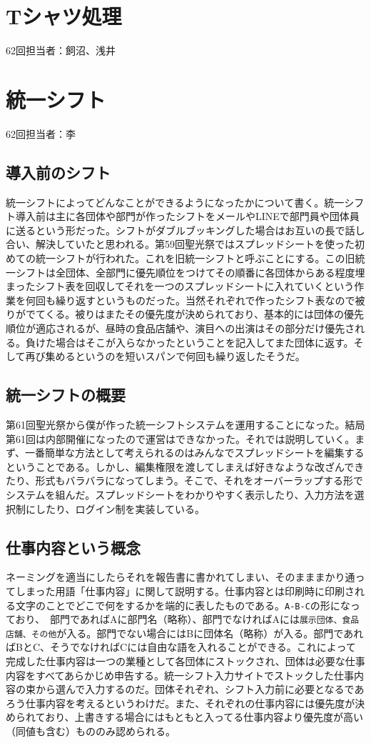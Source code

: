 \documentclass[dvipdfmx,jb5]{jarticle}
\begin{document}
 \section{Tシャツ処理}
 62回担当者：飼沼、浅井

 \section{統一シフト}\label{sec:統一シフト}
 62回担当者：李
  \subsection{導入前のシフト}
  統一シフトによってどんなことができるようになったかについて書く。統一シフト導入前は主に各団体や部門が作ったシフトをメールやLINEで部門員や団体員に送るという形だった。シフトがダブルブッキングした場合はお互いの長で話し合い、解決していたと思われる。第59回聖光祭ではスプレッドシートを使った初めての統一シフトが行われた。これを旧統一シフトと呼ぶことにする。この旧統一シフトは全団体、全部門に優先順位をつけてその順番に各団体からある程度埋まったシフト表を回収してそれを一つのスプレッドシートに入れていくという作業を何回も繰り返すというものだった。当然それぞれで作ったシフト表なので被りがでてくる。被りはまたその優先度が決められており、基本的には団体の優先順位が適応されるが、昼時の食品店舗や、演目への出演はその部分だけ優先される。負けた場合はそこが入らなかったということを記入してまた団体に返す。そして再び集めるというのを短いスパンで何回も繰り返したそうだ。
  \subsection{統一シフトの概要}
  第61回聖光祭から僕が作った統一シフトシステムを運用することになった。結局第61回は内部開催になったので運営はできなかった。それでは説明していく。まず、一番簡単な方法として考えられるのはみんなでスプレッドシートを編集するということである。しかし、編集権限を渡してしまえば好きなような改ざんできたり、形式もバラバラになってしまう。そこで、それをオーバーラップする形でシステムを組んだ。スプレッドシートをわかりやすく表示したり、入力方法を選択制にしたり、ログイン制を実装している。
  \subsection{仕事内容という概念}
  ネーミングを適当にしたらそれを報告書に書かれてしまい、そのまままかり通ってしまった用語「仕事内容」に関して説明する。仕事内容とは印刷時に印刷される文字のことでどこで何をするかを端的に表したものである。\verb+A-B-C+の形になっており、　部門であればAに部門名（略称）、部門でなければAには\verb+展示団体、食品店舗、その他+が入る。部門でない場合にはBに団体名（略称）が入る。部門であればBとC、そうでなければCには自由な語を入れることができる。これによって完成した仕事内容は一つの業種として各団体にストックされ、団体は必要な仕事内容をすべてあらかじめ申告する。統一シフト入力サイトでストックした仕事内容の束から選んで入力するのだ。団体それぞれ、シフト入力前に必要となるであろう仕事内容を考えるというわけだ。また、それぞれの仕事内容には優先度が決められており、上書きする場合にはもともと入ってる仕事内容より優先度が高い（同値も含む）もののみ認められる。
\end{document}
